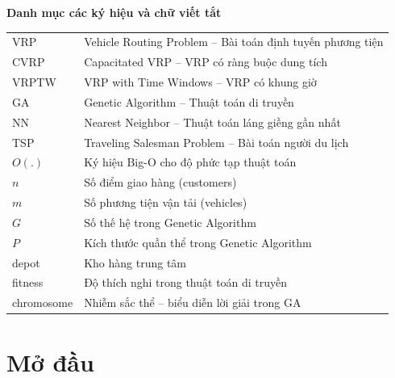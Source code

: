 \documentclass[12pt,a4paper,openany,oneside]{report}
\begin{document}
\newpage 
{} 
\listoftables

\newpage
{}

\begin{center}
{\LARGE
{\bf Danh mục các ký hiệu và chữ viết tắt}}
\end{center}
\vspace{1.25cm}
{\fontsize{13}{13}\selectfont
\begin{tabular}{ll}
VRP & Vehicle Routing Problem -- Bài toán định tuyến phương tiện \\
CVRP & Capacitated VRP -- VRP có ràng buộc dung tích \\
VRPTW & VRP with Time Windows -- VRP có khung giờ \\
GA & Genetic Algorithm -- Thuật toán di truyền \\
NN & Nearest Neighbor -- Thuật toán láng giềng gần nhất \\
TSP & Traveling Salesman Problem -- Bài toán người du lịch \\
$O(.)$ & Ký hiệu Big-O cho độ phức tạp thuật toán \\
$n$ & Số điểm giao hàng (customers) \\
$m$ & Số phương tiện vận tải (vehicles) \\
$G$ & Số thế hệ trong Genetic Algorithm \\
$P$ & Kích thước quần thể trong Genetic Algorithm \\
depot & Kho hàng trung tâm \\
fitness & Độ thích nghi trong thuật toán di truyền \\
chromosome & Nhiễm sắc thể -- biểu diễn lời giải trong GA \\
\end{tabular}
}

\newpage
{} 
\pagestyle{fancy} 

\chapter*{Mở đầu}
\end{document}

